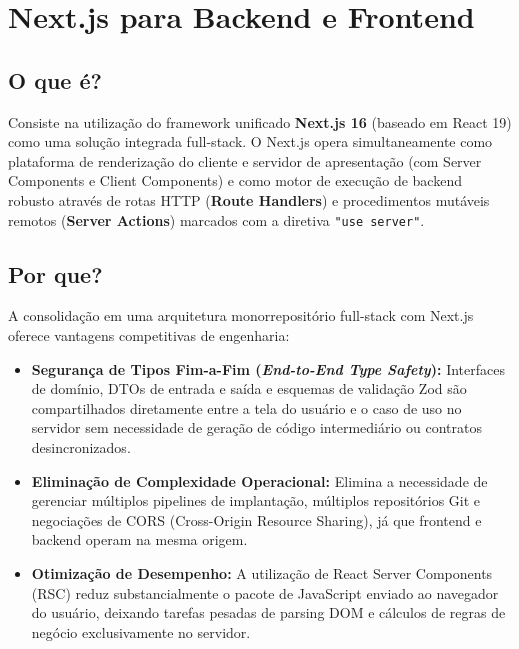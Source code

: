\documentclass[12pt,a4paper]{article}
\begin{document}
\section{Next.js para Backend e Frontend}

\subsection{O que é?}
Consiste na utilização do framework unificado \textbf{Next.js 16} (baseado em React 19) como uma solução integrada full-stack. O Next.js opera simultaneamente como plataforma de renderização do cliente e servidor de apresentação (com Server Components e Client Components) e como motor de execução de backend robusto através de rotas HTTP (\textbf{Route Handlers}) e procedimentos mutáveis remotos (\textbf{Server Actions}) marcados com a diretiva \texttt{"use server"}.

\subsection{Por que?}
A consolidação em uma arquitetura monorrepositório full-stack com Next.js oferece vantagens competitivas de engenharia:
\begin{itemize}
  \item \textbf{Segurança de Tipos Fim-a-Fim (\textit{End-to-End Type Safety}):} Interfaces de domínio, DTOs de entrada e saída e esquemas de validação Zod são compartilhados diretamente entre a tela do usuário e o caso de uso no servidor sem necessidade de geração de código intermediário ou contratos desincronizados.
  \item \textbf{Eliminação de Complexidade Operacional:} Elimina a necessidade de gerenciar múltiplos pipelines de implantação, múltiplos repositórios Git e negociações de CORS (Cross-Origin Resource Sharing), já que frontend e backend operam na mesma origem.
  \item \textbf{Otimização de Desempenho:} A utilização de React Server Components (RSC) reduz substancialmente o pacote de JavaScript enviado ao navegador do usuário, deixando tarefas pesadas de parsing DOM e cálculos de regras de negócio exclusivamente no servidor.
\end{itemize}
\end{document}
